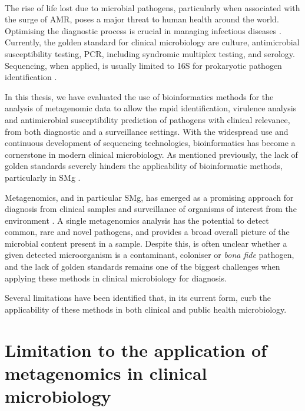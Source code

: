 \renewcommand*{\thefootnote}{\arabic{footnote}}

\mbox{}\\
\vspace{8cm}

The rise of life lost due to microbial pathogens, particularly when associated with the surge of \ac{AMR}, poses a major threat to human health around the world. Optimising the diagnostic process is crucial in managing infectious diseases \citep{vos_global_2020}. Currently, the golden standard for clinical microbiology are culture, antimicrobial susceptibility testing, \ac{PCR}, including syndromic multiplex testing, and serology. Sequencing, when applied, is usually limited to 16S for prokaryotic pathogen identification \citep{greninger_challenge_2018}. 

In this thesis, we have evaluated the use of bioinformatics methods for the analysis of metagenomic data to allow the rapid identification, virulence analysis and antimicrobial susceptibility prediction of pathogens with clinical relevance, from both diagnostic and a surveillance settings. With the widespread use and continuous development of sequencing technologies, bioinformatics has become a cornerstone in modern clinical microbiology. As mentioned previously, the lack of golden standards severely hinders the applicability of bioinformatic methods, particularly in \ac{SMg} \citep{carrico_primer_2018, couto_critical_2018, angers-loustau_challenges_2018, gruening_recommendations_2019, sczyrba_critical_2017}. 

Metagenomics, and in particular \ac{SMg}, has emerged as a promising approach for diagnosis from clinical samples and surveillance of organisms of interest from the environment \citep{loman_culture-independent_2013, rossen__2018, schuele_future_2021, chiu_clinical_2019}. A single metagenomics analysis has the potential to detect common, rare and novel pathogens, and provides a broad overall picture of the microbial content present in a sample. Despite this, is often unclear whether a given detected microorganism is a contaminant, coloniser or \textit{bona fide} pathogen, and the lack of golden standards remains one of the biggest challenges when applying these methods in clinical microbiology for diagnosis. 

Several limitations have been identified that, in its current form, curb the applicability of these methods in both clinical and public health microbiology. 

\section{Limitation to the application of metagenomics in clinical microbiology}

